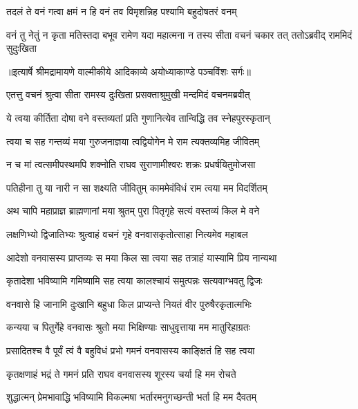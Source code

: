 \twolineshloka
{तदलं ते वनं गत्वा क्षमं न हि वनं तव}
{विमृशन्निह पश्यामि बहुदोषतरं वनम्} %

\fourlineindentedshloka
{वनं तु नेतुं न कृता मतिस्तदा}
{बभूव रामेण यदा महात्मना}
{न तस्य सीता वचनं चकार तत्}
{ततोऽब्रवीद् राममिदं सुदुःखिता} %


{॥इत्यार्षे श्रीमद्रामायणे वाल्मीकीये आदिकाव्ये अयोध्याकाण्डे पञ्चविंशः सर्गः॥}


\twolineshloka
{एतत्तु वचनं श्रुत्वा सीता रामस्य दुःखिता}
{प्रसक्ताश्रुमुखी मन्दमिदं वचनमब्रवीत्} %

\twolineshloka
{ये त्वया कीर्तिता दोषा वने वस्तव्यतां प्रति}
{गुणानित्येव तान्विद्धि तव स्नेहपुरस्कृतान्} %

\twolineshloka
{त्वया च सह गन्तव्यं मया गुरुजनाज्ञया}
{त्वद्वियोगेन मे राम त्यक्तव्यमिह जीवितम्} %

\twolineshloka
{न च मां त्वत्समीपस्थमपि शक्नोति राघव}
{सुराणामीश्वरः शक्रः प्रधर्षयितुमोजसा} %

\twolineshloka
{पतिहीना तु या नारी न सा शक्ष्यति जीवितुम्}
{काममेवंविधं राम त्वया मम विदर्शितम्} %

\twolineshloka
{अथ चापि महाप्राज्ञ ब्राह्मणानां मया श्रुतम्}
{पुरा पितृगृहे सत्यं वस्तव्यं किल मे वने} %

\twolineshloka
{लक्षणिभ्यो द्विजातिभ्यः श्रुत्वाहं वचनं गृहे}
{वनवासकृतोत्साहा नित्यमेव महाबल} %

\twolineshloka
{आदेशो वनवासस्य प्राप्तव्यः स मया किल}
{सा त्वया सह तत्राहं यास्यामि प्रिय नान्यथा} %

\twolineshloka
{कृतादेशा भविष्यामि गमिष्यामि सह त्वया}
{कालश्चायं समुत्पन्नः सत्यवाग्भवतु द्विजः} %

\twolineshloka
{वनवासे हि जानामि दुःखानि बहुधा किल}
{प्राप्यन्ते नियतं वीर पुरुषैरकृतात्मभिः} %

\twolineshloka
{कन्यया च पितुर्गेहे वनवासः श्रुतो मया}
{भिक्षिण्याः साधुवृत्ताया मम मातुरिहाग्रतः} %

\twolineshloka
{प्रसादितश्च वै पूर्वं त्वं वै बहुविधं प्रभो}
{गमनं वनवासस्य काङ्क्षितं हि सह त्वया} %

\twolineshloka
{कृतक्षणाहं भद्रं ते गमनं प्रति राघव}
{वनवासस्य शूरस्य चर्या हि मम रोचते} %

\twolineshloka
{शुद्धात्मन् प्रेमभावाद्धि भविष्यामि विकल्मषा}
{भर्तारमनुगच्छन्ती भर्ता हि मम दैवतम्} %

